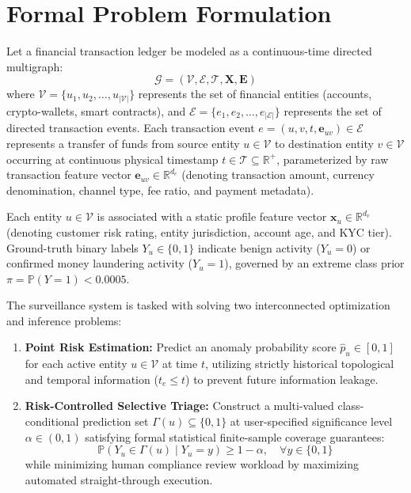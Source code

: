 \section{Formal Problem Formulation}
\label{sec:problem_formulation}

Let a financial transaction ledger be modeled as a continuous-time directed multigraph:
\begin{equation}
\mathcal{G} = (\mathcal{V}, \mathcal{E}, \mathcal{T}, \mathbf{X}, \mathbf{E})
\end{equation}
where $\mathcal{V} = \{u_1, u_2, \dots, u_{|\mathcal{V}|}\}$ represents the set of financial entities (accounts, crypto-wallets, smart contracts), and $\mathcal{E} = \{e_1, e_2, \dots, e_{|\mathcal{E}|}\}$ represents the set of directed transaction events. Each transaction event $e = (u, v, t, \mathbf{e}_{uv}) \in \mathcal{E}$ represents a transfer of funds from source entity $u \in \mathcal{V}$ to destination entity $v \in \mathcal{V}$ occurring at continuous physical timestamp $t \in \mathcal{T} \subseteq \mathbb{R}^+$, parameterized by raw transaction feature vector $\mathbf{e}_{uv} \in \mathbb{R}^{d_e}$ (denoting transaction amount, currency denomination, channel type, fee ratio, and payment metadata).

Each entity $u \in \mathcal{V}$ is associated with a static profile feature vector $\mathbf{x}_u \in \mathbb{R}^{d_v}$ (denoting customer risk rating, entity jurisdiction, account age, and KYC tier). Ground-truth binary labels $Y_u \in \{0, 1\}$ indicate benign activity ($Y_u = 0$) or confirmed money laundering activity ($Y_u = 1$), governed by an extreme class prior $\pi = \mathbb{P}(Y=1) < 0.0005$.

The surveillance system is tasked with solving two interconnected optimization and inference problems:
\begin{enumerate}
    \item \textbf{Point Risk Estimation:} Predict an anomaly probability score $\hat{p}_u \in [0, 1]$ for each active entity $u \in \mathcal{V}$ at time $t$, utilizing strictly historical topological and temporal information ($t_e \le t$) to prevent future information leakage.
    \item \textbf{Risk-Controlled Selective Triage:} Construct a multi-valued class-conditional prediction set $\Gamma(u) \subseteq \{0, 1\}$ at user-specified significance level $\alpha \in (0, 1)$ satisfying formal statistical finite-sample coverage guarantees:
    \begin{equation}
    \mathbb{P}\left( Y_u \in \Gamma(u) \mid Y_u = y \right) \ge 1 - \alpha, \quad \forall y \in \{0, 1\}
    \end{equation}
    while minimizing human compliance review workload by maximizing automated straight-through execution.
\end{enumerate}

